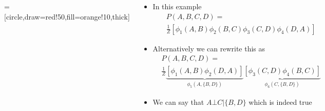 \documentclass[serif,aspectratio=169,dvipsnames]{beamer}
\begin{document}
\begin{frame}
	\begin{columns}
		\begin{overlayarea}{\textwidth}{\textheight}
			\begin{center}
					=[circle,draw=red!50,fill=orange!10,thick]
				\end{center}
		\end{overlayarea}
		\begin{overlayarea}{\textwidth}{\textheight}
			\begin{itemize}[<+->]\justifying
				\item In this example
				\begin{align*}
					&P(A,B,C,D) = \\
					&\frac{1}{Z} [ \phi_1(A,B) \phi_2(B,C) \phi_3(C,D) \phi_4(D,A)]
				\end{align*}
				\item Alternatively we can rewrite this as 
				\begin{align*}
					&P(A,B,C,D) = \\
					&\frac{1}{Z} \underbrace{[ \phi_1(A,B) \phi_2(D,A) ]}_{\phi_5(A,\{B,D\})} \underbrace{[\phi_3(C,D) \phi_4(B,C)]}_{\phi_6(C,\{B,D\})}
				\end{align*}
				\item We can say that $A \bot C|\{B,D\}$ which is indeed true
			\end{itemize}
		\end{overlayarea}
	\end{columns}
\end{frame}
\end{document}
